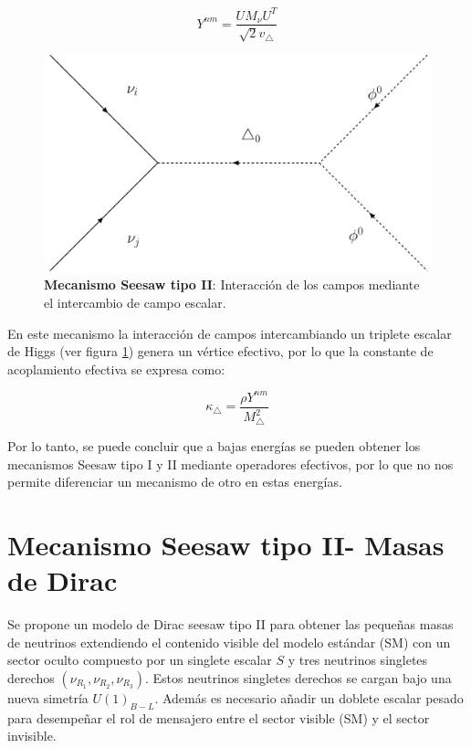 \documentclass[12pt]{article}
\begin{document}
\begin{equation}
Y^{nm}=\frac{UM_{\nu}U^{T}}{\sqrt{2}v_\triangle}
    \label{eq:26}
\end{equation}


\begin{figure}[h!]
  \begin{center}
  \includegraphics[scale=0.4]{Mecanismo See-saw tipo IIMajorana.pdf}
\caption{{\textbf{Mecanismo Seesaw tipo II}: Interacción de los campos mediante el intercambio de campo escalar.}}
\label{fig:Majorana2}
\end{center}
\end{figure}

En este mecanismo la interacción de campos intercambiando un triplete escalar de Higgs (ver figura \ref{fig:Majorana2}) genera un vértice efectivo, por lo que la constante de acoplamiento
efectiva se expresa como: 

\begin{equation}
    \kappa_\triangle=\frac{\rho Y^{nm}}{M^{2}_\triangle }
\end{equation}

Por lo tanto, se puede concluir que a bajas energías se pueden obtener los mecanismos Seesaw tipo I y II mediante operadores efectivos, por lo que no nos permite diferenciar un mecanismo de otro en estas energías.


\section{Mecanismo Seesaw tipo II- Masas de Dirac}

Se propone un modelo de Dirac seesaw tipo II para obtener las pequeñas masas de neutrinos extendiendo el contenido visible del modelo estándar (SM) con un sector oculto compuesto por un singlete escalar $S$ y tres  neutrinos singletes derechos $(\nu_{R_1},\nu_{R_2}, \nu_{R_3} )$. Estos neutrinos singletes derechos se cargan bajo una nueva simetría $U(1)_{B-L}$. Además es necesario añadir un doblete escalar pesado para desempeñar el rol de mensajero entre el sector visible (SM) y el sector invisible. 
\end{document}
